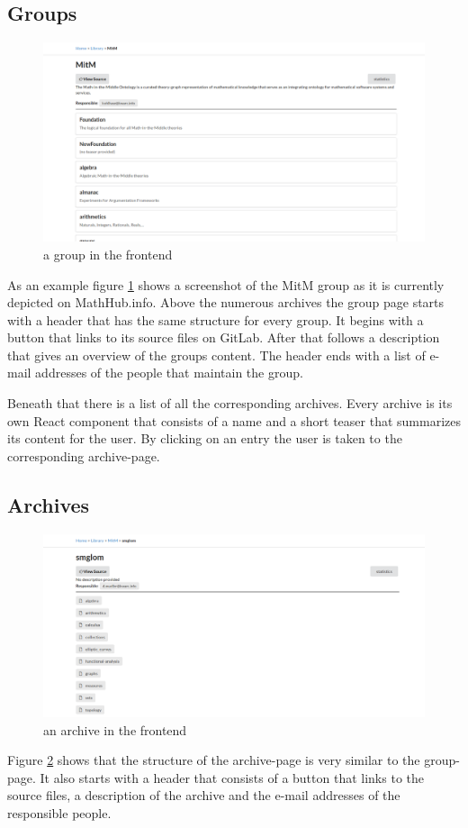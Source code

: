 \documentclass[11pt,a4paper]{article}
\begin{document}
\subsection{Groups}
\begin{figure}[H]
\includegraphics[width=1\textwidth]{group.png}
\caption{a group in the frontend}
\label{fig:group}
\end{figure}
As an example figure \ref{fig:group} shows a screenshot of the MitM group as it is currently depicted on MathHub.info.
Above the numerous archives the group page starts with a header that has the same structure for every group.
It begins with a button that links to its source files on GitLab.
After that follows a description that gives an overview of the groups content.
The header ends with a list of e-mail addresses of the people that maintain the group.

Beneath that there is a list of all the corresponding archives.
Every archive is its own React component that consists of a name and a short teaser that summarizes its content for the user.
By clicking on an entry the user is taken to the corresponding archive-page.

\subsection{Archives}
\begin{figure}[H]
\includegraphics[width=1\textwidth]{archive.png}
\caption{ an archive in the frontend}
\label{fig:archive}
\end{figure}
Figure \ref{fig:archive} shows that the structure of the archive-page is very similar to the group-page.
It also starts with a header that consists of a button that links to the source files, a description of the archive and the e-mail addresses of the responsible people. 
\end{document}
